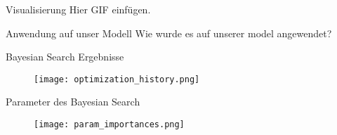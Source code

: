 \begin{frame}{Visualisierung}
    Hier GIF einfügen.
\end{frame}


\begin{frame}[fragile]{Anwendung auf unser Modell}
Wie wurde es auf unserer model angewendet?
\end{frame}



\begin{frame}{Bayesian Search Ergebnisse}
    \begin{figure}
        \centering
        \texttt{[image: optimization\_history.png]}
    \end{figure}
\end{frame}


\begin{frame}{Parameter des Bayesian Search}
    \begin{figure}
        \centering
        \texttt{[image: param\_importances.png]}
    \end{figure}
\end{frame}